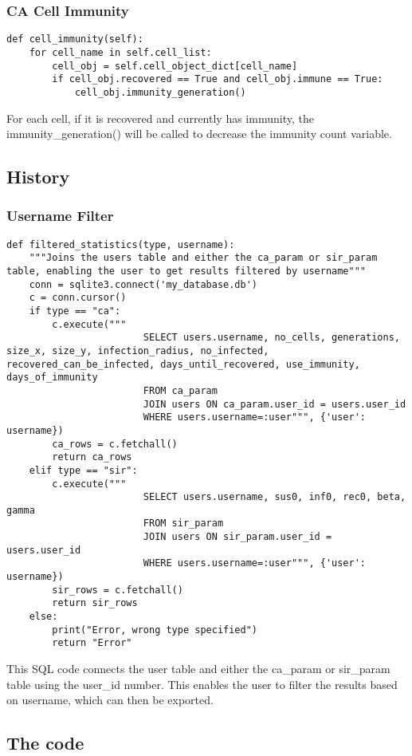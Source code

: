 \documentclass[11pt, a4paper]{article}
\begin{document}
\subsubsection{CA Cell Immunity}
\begin{lstlisting}
def cell_immunity(self):
    for cell_name in self.cell_list:
        cell_obj = self.cell_object_dict[cell_name]
        if cell_obj.recovered == True and cell_obj.immune == True:
            cell_obj.immunity_generation()
\end{lstlisting}
For each cell, if it is recovered and currently has immunity, the immunity\_generation() will be called to decrease the immunity count variable.
\subsection{History}
\subsubsection{Username Filter}
\begin{lstlisting}
def filtered_statistics(type, username):
	"""Joins the users table and either the ca_param or sir_param table, enabling the user to get results filtered by username"""
    conn = sqlite3.connect('my_database.db')
    c = conn.cursor()
    if type == "ca":
        c.execute("""
                        SELECT users.username, no_cells, generations, size_x, size_y, infection_radius, no_infected, recovered_can_be_infected, days_until_recovered, use_immunity, days_of_immunity
                        FROM ca_param
                        JOIN users ON ca_param.user_id = users.user_id
                        WHERE users.username=:user""", {'user': username})
        ca_rows = c.fetchall()
        return ca_rows
    elif type == "sir":
        c.execute("""
                        SELECT users.username, sus0, inf0, rec0, beta, gamma
                        FROM sir_param
                        JOIN users ON sir_param.user_id = users.user_id
                        WHERE users.username=:user""", {'user': username})
        sir_rows = c.fetchall()
        return sir_rows
    else:
        print("Error, wrong type specified")
        return "Error"
\end{lstlisting}
This SQL code connects the user table and either the ca\_param or sir\_param table using the user\_id number. This enables the user to filter the results based on username, which can then be exported.
\newpage
\subsection{The code}
\end{document}
